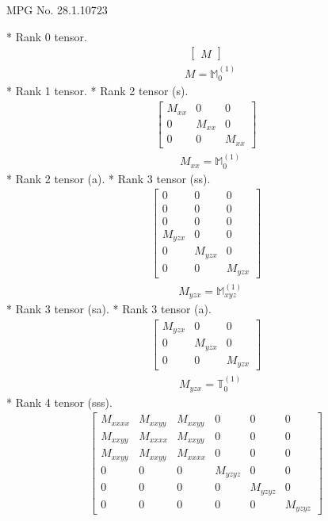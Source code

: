 \documentclass[fleqn,8pt,landscape]{jsarticle}
\begin{document}
\setcounter{MaxMatrixCols}{32}

\renewcommand{\tablename}{Table~}
\renewcommand{\figurename}{Figure~}
\begin{center}
\LARGE
MPG No. 28.1.107\quad$23$
\end{center}
* Rank 0 tensor.
\begin{align*}
\begin{bmatrix} M \end{bmatrix}
\end{align*}
\begin{align*}
& M = \mathbb{M}_{0}^{(1)}
\end{align*}
* Rank 1 tensor.
* Rank 2 tensor (s).
\begin{align*}
\begin{bmatrix} M_{xx} & 0 & 0 \\ 0 & M_{xx} & 0 \\ 0 & 0 & M_{xx} \end{bmatrix}
\end{align*}
\begin{align*}
& M_{xx} = \mathbb{M}_{0}^{(1)}
\end{align*}
* Rank 2 tensor (a).
* Rank 3 tensor (ss).
\begin{align*}
\begin{bmatrix} 0 & 0 & 0 \\ 0 & 0 & 0 \\ 0 & 0 & 0 \\ M_{yzx} & 0 & 0 \\ 0 & M_{yzx} & 0 \\ 0 & 0 & M_{yzx} \end{bmatrix}
\end{align*}
\begin{align*}
& M_{yzx} = \mathbb{M}_{xyz}^{(1)}
\end{align*}
* Rank 3 tensor (sa).
* Rank 3 tensor (a).
\begin{align*}
\begin{bmatrix} M_{yzx} & 0 & 0 \\ 0 & M_{yzx} & 0 \\ 0 & 0 & M_{yzx} \end{bmatrix}
\end{align*}
\begin{align*}
& M_{yzx} = \mathbb{T}_{0}^{(1)}
\end{align*}
* Rank 4 tensor (sss).
\begin{align*}
\begin{bmatrix} M_{xxxx} & M_{xxyy} & M_{xxyy} & 0 & 0 & 0 \\ M_{xxyy} & M_{xxxx} & M_{xxyy} & 0 & 0 & 0 \\ M_{xxyy} & M_{xxyy} & M_{xxxx} & 0 & 0 & 0 \\ 0 & 0 & 0 & M_{yzyz} & 0 & 0 \\ 0 & 0 & 0 & 0 & M_{yzyz} & 0 \\ 0 & 0 & 0 & 0 & 0 & M_{yzyz} \end{bmatrix}
\end{align*}
\end{document}
